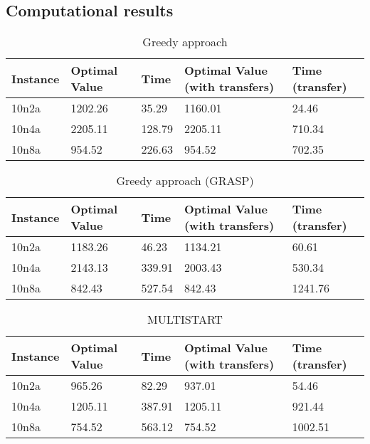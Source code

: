 \documentclass[10pt,twoside]{article}
\begin{document}
\newpage
\subsection{Computational results}\label{sec_eval}

\begin{table}[H]
\caption{Greedy approach}
\begin{tabular}{lllll}
  \hline
  Instance & Optimal Value & Time   & Optimal Value (with transfers) & Time (transfer) \\
  \hline
  10n2a    & 1202.26       & 35.29  & 1160.01                        & 24.46  \\
  10n4a    & 2205.11       & 128.79 & 2205.11                        & 710.34 \\
  10n8a    & 954.52        & 226.63 & 954.52                         & 702.35 \\
  \hline
\end{tabular}
\end{table}

\begin{table}[H]
\caption{Greedy approach (GRASP)}
\begin{tabular}{lllll}
  \hline
  Instance & Optimal Value & Time   & Optimal Value (with transfers) & Time (transfer) \\
  \hline
  10n2a    & 1183.26       & 46.23  & 1134.21                        & 60.61  \\
  10n4a    & 2143.13       & 339.91 & 2003.43                        & 530.34 \\
  10n8a    & 842.43        & 527.54 & 842.43                         & 1241.76\\
  \hline
\end{tabular}
\end{table}

\begin{table}[H]
\caption{MULTISTART}
\begin{tabular}{lllll}
  \hline
  Instance & Optimal Value & Time   & Optimal Value (with transfers) & Time (transfer) \\
  \hline
  10n2a    & 965.26        & 82.29  & 937.01                         & 54.46  \\
  10n4a    & 1205.11       & 387.91 & 1205.11                        & 921.44 \\
  10n8a    & 754.52        & 563.12 & 754.52                         & 1002.51\\
  \hline
\end{tabular}
\end{table}
\end{document}
